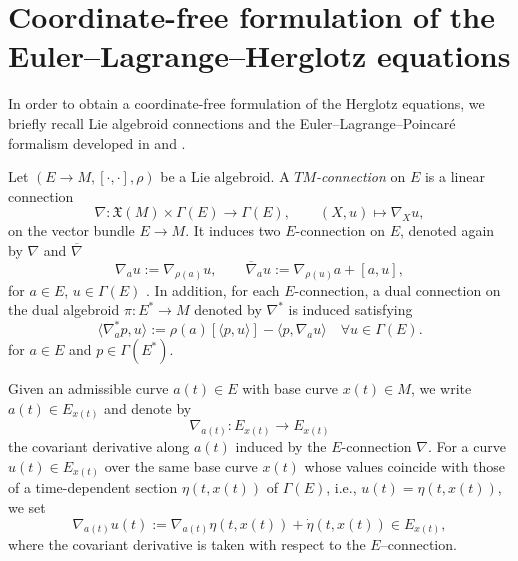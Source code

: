 \documentclass[11pt,a4paper]{article}
\theoremstyle{definition}
\begin{document}
\section{Coordinate-free formulation of the Euler--Lagrange--Herglotz equations}\label{sec:coordinate_free}


In order to obtain a coordinate-free formulation of the Herglotz equations,
we briefly recall Lie algebroid connections and the
Euler--Lagrange--Poincar\'e formalism developed in 
\cite{li2017lagrangian} and \cite{hu2024hamiltonian}.

Let $(E\to M,[\cdot,\cdot],\rho)$ be a Lie algebroid.
A \emph{$TM$-connection} on $E$ is a linear connection
\[
\nabla \colon \mathfrak{X}(M)\times\Gamma(E)\longrightarrow\Gamma(E),
\qquad (X,u)\mapsto\nabla_X u,
\]
on the vector bundle $E\to M$.  
It induces two $E$-connection on $E$, denoted again by $\nabla$ and $\overline{\nabla}$
\[
        \nabla_a u := \nabla_{\rho(a)}u, \qquad
        \overline{\nabla}_{a} u := \nabla_{\rho(u)}a + [a, u],
        \]
        for $a\in E$, $u\in\Gamma(E)$ . In addition, for each $E$-connection, a dual connection on the dual algebroid $\pi:E^{*}\to M$ denoted by $\nabla^*$ is induced satisfying
        \[
        \langle \nabla^*_a p, u \rangle := \rho(a)\left[\langle p,u \rangle \right]-\langle p,\nabla_{a}u \rangle \quad \forall u\in \Gamma(E).
        \]
        for $a\in E$ and $p\in\Gamma(E^*)$.

Given an admissible curve $a(t)\in E$ with base curve $x(t)\in M$,
we write $a(t)\in E_{x(t)}$ and denote by
\[
\nabla_{a(t)} \colon E_{x(t)}\longrightarrow E_{x(t)}
\]
the covariant derivative along $a(t)$ induced by the $E$-connection $\nabla$.
For a curve $u(t)\in E_{x(t)}$ over the same base curve $x(t)$ whose values coincide with those of a time-dependent section $\eta(t,x(t))$ of $\Gamma(E)$, i.e., $u(t)=\eta(t,x(t))$, we set
\[
\nabla_{a(t)}u(t):=\nabla_{a(t)} \eta (t,x(t)) + \dot{\eta}(t,x(t))\in E_{x(t)},
\]
where the covariant derivative is taken with respect to the $E$–connection.

\end{document}
